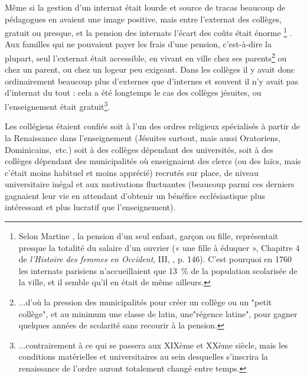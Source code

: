 Même si la gestion d'un internat était lourde et source de tracas beaucoup de pédagogues en avaient une image positive, mais entre l'externat des collèges, gratuit ou presque, et la pension des internats l'écart des coûts était énorme%
\footnote{Selon Martine , la pension d'un seul enfant, garçon ou fille, représentait presque la totalité du salaire d'un ouvrier (« une fille à éduquer », Chapitre 4 de \emph{l'Histoire des femmes en Occident}, III, , p. 146). C'est pourquoi en 1760 les internats parisiens n'accueillaient que 13~\% de la population scolarisée de la ville, et il semble qu'il en était de même ailleurs.}%
. Aux familles qui ne pouvaient payer les frais d'une pension, c'est-à-dire la plupart, seul l'externat était accessible, en vivant en ville chez ses parents\footnote{...d'où la pression des municipalités pour créer un collège ou un "petit collège", et au minimum une classe de latin, une"régence latine", pour gagner quelques années de scolarité sans recourir à la pension.} ou chez un parent, ou chez un logeur peu exigeant. Dans les collèges il y avait donc ordinairement beaucoup plus d'externes que d'internes et souvent il n'y avait pas d'internat du tout : cela a été longtemps le cas des collèges jésuites, ou l'enseignement était gratuit\footnote{...contrairement à ce qui se passera aux XIXème et XXème siècle, mais les conditions matérielles et universitaires au sein desquelles s'inscrira la renaissance de l'ordre auront totalement changé entre temps.}. 

 
 

Les collégiens étaient confiés soit à l'un des ordres religieux spécialisés à partir de la Renaissance dans l'enseignement (Jésuites surtout, mais aussi Oratoriens, Dominicains,~etc.) soit à des collèges dépendant des universités, soit à des collèges dépendant des municipalités où enseignaient des clercs (ou des laïcs, mais c'était moins habituel et moins apprécié) recrutés sur place, de niveau universitaire inégal et aux motivations fluctuantes (beaucoup parmi ces derniers gagnaient leur vie en attendant d'obtenir un bénéfice ecclésiastique plus intéressant et plus lucratif que l'enseignement). 

